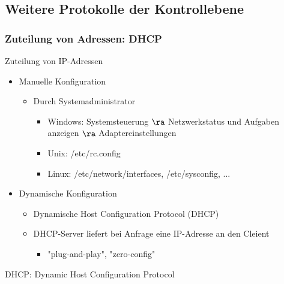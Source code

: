   \subsection{Weitere Protokolle der Kontrollebene}
    \subsubsection{Zuteilung von Adressen: DHCP}
      Zuteilung von IP-Adressen
      \begin{itemize}
        \item Manuelle Konfiguration
          \begin{itemize}
            \item Durch Systemadministrator
              \begin{itemize}
                \item Windows: Systemsteuerung $\ra$ Netzwerkstatus und Aufgaben anzeigen $\ra$
                  Adaptereinstellungen
                \item Unix: /etc/rc.config
                \item Linux: /etc/network/interfaces, /etc/sysconfig, ...
              \end{itemize}
          \end{itemize}
        \item Dynamische Konfiguration
          \begin{itemize}
            \item Dynamische Host Configuration Protocol (DHCP)
            \item DHCP-Server liefert bei Anfrage eine IP-Adresse an den Cleient
              \begin{itemize}
                \item "plug-and-play", "zero-config"
              \end{itemize}
          \end{itemize}
      \end{itemize}
      DHCP: Dynamic Host Configuration Protocol
